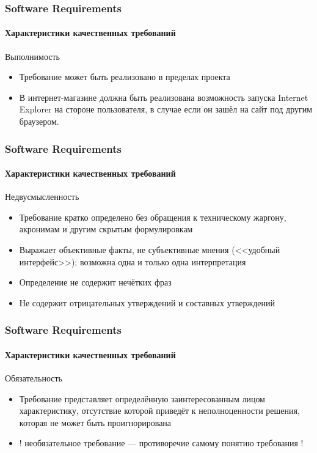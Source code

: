 \documentclass[aspectratio=169, 12pt]{beamer}
\begin{document}
\begin{frame}[t]
    \frametitle{Software Requirements}
    \framesubtitle{Характеристики качественных требований}
    Выполнимость \newline
    \begin{itemize}
        \item Требование может быть реализовано в пределах проекта \newline \pause
        \item В интернет-магазине должна быть реализована возможность запуска Internet Explorer на стороне
              пользователя, в случае если он зашёл на сайт под другим браузером.
    \end{itemize}
\end{frame}

\begin{frame}[t]
    \frametitle{Software Requirements}
    \framesubtitle{Характеристики качественных требований}
    Недвусмысленность \newline \pause
    \begin{itemize}
        \item Требование кратко определено без обращения к техническому жаргону, акронимам
              и другим скрытым формулировкам \pause
        \item Выражает объективные факты, не субъективные мнения (<<удобный интерфейс>>);
              возможна одна и только одна интерпретация \pause
        \item Определение не содержит нечётких фраз \pause
        \item Не содержит отрицательных утверждений и составных утверждений
    \end{itemize}
\end{frame}

\begin{frame}[t]
    \frametitle{Software Requirements}
    \framesubtitle{Характеристики качественных требований}
    Обязательность \newline
    \begin{itemize}
        \item Требование представляет определённую заинтересованным лицом характеристику,
              отсутствие которой приведёт к неполноценности решения, которая не может быть проигнорирована \newline \pause
        \item ! необязательное требование --- противоречие самому понятию требования !
    \end{itemize}
\end{frame}
\end{document}

